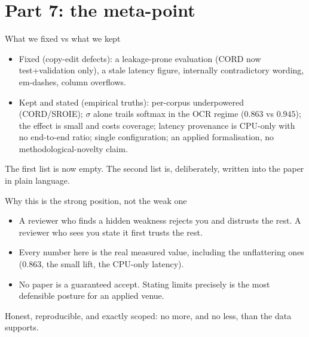 \documentclass[aspectratio=169]{beamer}
\newcommand{\keybox}[1]{\begin{center}\colorbox{grey!15}{\parbox{0.92\linewidth}{\centering #1}}\end{center}}
\begin{document}
\section{Part 7: the meta-point}
\begin{frame}{What we fixed vs what we kept}
\begin{itemize}
\item \textcolor{ok}{Fixed (copy-edit defects):} a leakage-prone
evaluation (CORD now test+validation only), a stale latency figure,
internally contradictory wording, em-dashes, column overflows.
\item \textcolor{bad}{Kept and stated (empirical truths):} per-corpus
underpowered (CORD/SROIE); $\sigma$ alone trails softmax in the OCR
regime ($0.863$ vs $0.945$); the effect is small and costs coverage;
latency provenance is CPU-only with no end-to-end ratio; single
configuration; an applied formalisation, no methodological-novelty
claim.
\end{itemize}
\keybox{The first list is now empty. The second list is, deliberately,
written into the paper in plain language.}
\end{frame}

\begin{frame}{Why this is the strong position, not the weak one}
\begin{itemize}
\item A reviewer who finds a hidden weakness rejects you and distrusts
the rest. A reviewer who sees you state it first trusts the rest.
\item Every number here is the real measured value, including the
unflattering ones (0.863, the small lift, the CPU-only latency).
\item No paper is a guaranteed accept. Stating limits precisely is the
most defensible posture for an applied venue.
\end{itemize}
\keybox{Honest, reproducible, and exactly scoped: no more, and no less,
than the data supports.}
\end{frame}
\end{document}
